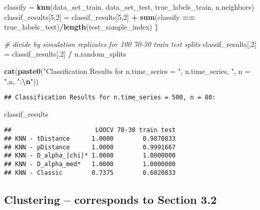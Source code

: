 \documentclass[
]{article}
\newenvironment{Shaded}{\begin{snugshade}}{\end{snugshade}}
\newcommand{\CommentTok}[1]{\textcolor[rgb]{0.56,0.35,0.01}{\textit{#1}}}
\newcommand{\DecValTok}[1]{\textcolor[rgb]{0.00,0.00,0.81}{#1}}
\newcommand{\FunctionTok}[1]{\textcolor[rgb]{0.13,0.29,0.53}{\textbf{#1}}}
\newcommand{\NormalTok}[1]{#1}
\newcommand{\OtherTok}[1]{\textcolor[rgb]{0.56,0.35,0.01}{#1}}
\newcommand{\SpecialCharTok}[1]{\textcolor[rgb]{0.81,0.36,0.00}{\textbf{#1}}}
\newcommand{\StringTok}[1]{\textcolor[rgb]{0.31,0.60,0.02}{#1}}
\begin{document}
\begin{Shaded}
\begin{Highlighting}[]
\NormalTok{  classify }\OtherTok{=} \FunctionTok{knn}\NormalTok{(data\_set\_train, data\_set\_test, true\_labels\_train, n.neighbors)}
\NormalTok{  classif\_results[}\DecValTok{5}\NormalTok{,}\DecValTok{2}\NormalTok{] }\OtherTok{=}\NormalTok{ classif\_results[}\DecValTok{5}\NormalTok{,}\DecValTok{2}\NormalTok{] }\SpecialCharTok{+} \FunctionTok{sum}\NormalTok{(classify }\SpecialCharTok{==}\NormalTok{ true\_labels\_test)}\SpecialCharTok{/}\FunctionTok{length}\NormalTok{(test\_sample\_index)}
\NormalTok{\}}


\CommentTok{\# divide by simulation replicates for 100 70{-}30 train test splits }
\NormalTok{classif\_results[,}\DecValTok{2}\NormalTok{] }\OtherTok{=}\NormalTok{ classif\_results[,}\DecValTok{2}\NormalTok{] }\SpecialCharTok{/}\NormalTok{ n.random\_splits}

\FunctionTok{cat}\NormalTok{(}\FunctionTok{paste0}\NormalTok{(}\StringTok{"Classification Results for n.time\_series = "}\NormalTok{, n.time\_series, }\StringTok{", n = "}\NormalTok{,n, }\StringTok{":}\SpecialCharTok{\textbackslash{}n}\StringTok{"}\NormalTok{))}
\end{Highlighting}
\end{Shaded}

\begin{verbatim}
## Classification Results for n.time_series = 500, n = 80:
\end{verbatim}

\begin{Shaded}
\begin{Highlighting}[]
\NormalTok{classif\_results}
\end{Highlighting}
\end{Shaded}

\begin{verbatim}
##                       LOOCV 70-30 train test
## KNN - tDistance      1.0000        0.9870833
## KNN - pDistance      1.0000        0.9991667
## KNN - D_alpha_|chi|* 1.0000        1.0000000
## KNN - D_alpha_med*   1.0000        1.0000000
## KNN - Classic        0.7375        0.6020833
\end{verbatim}

\subsection{Clustering -- corresponds to Section
3.2}\label{clustering-corresponds-to-section-3.2}
\end{document}
